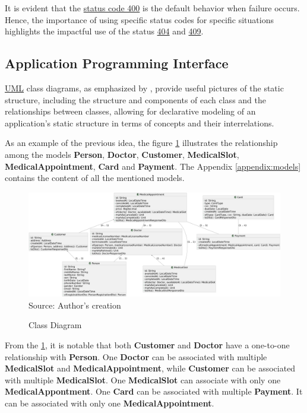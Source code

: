 It is evident that the \hyperref[tab:summary_http_status_codes]{status code 400} is the default behavior when failure occurs. Hence, the importance of using specific status
 codes for specific situations highlights the impactful use of the status \hyperref[appendix:http_status_codes_summary_appendix]{404} and \hyperref[appendix:http_status_codes_summary_appendix]{409}.

\subsection{Application Programming Interface}
\label{subsection:api}

\hyperref[appendix:glossary]{UML} class diagrams, as emphasized by \cite{BERARDI200570, herchi_abdessalem_2012}, provide useful pictures of the static structure, including the structure and components of each class and the relationships between classes, allowing for declarative modeling of an application's static structure in terms of concepts and their interrelations.

As an example of the previous idea, the figure \ref{fig:class_diagram} illustrates the relationship among the models \textbf{Person}, \textbf{Doctor}, \textbf{Customer}, \textbf{MedicalSlot}, \textbf{MedicalAppointment}, \textbf{Card} and \textbf{Payment}. The Appendix \ref{appendix:models} contains the content of all the mentioned models.

\begin{landscape}
\begin{figure}[H]
    \caption{Class Diagram}
    \centering
    \includegraphics[width=1\linewidth]{figures/class_diagram.png}
    \label{fig:class_diagram}
    \\ \footnotesize Source: Author's creation
\end{figure}
\end{landscape}

From the \ref{fig:class_diagram}, it is notable that both \textbf{Customer} and \textbf{Doctor} have a one-to-one relationship with \textbf{Person}. One \textbf{Doctor} can be associated with multiple  \textbf{MedicalSlot} and 
\textbf{MedicalAppointment}, while \textbf{Customer} can be associated with multiple \textbf{MedicalSlot}. One \textbf{MedicalSlot} can associate with only one \textbf{MedicalAppontment}. One \textbf{Card} can be associated with multiple  \textbf{Payment}. It can be associated with only one \textbf{MedicalAppointment}.

